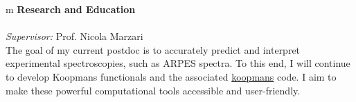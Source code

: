 \documentclass[10pt,a4paper,final]{article}
\begin{document}
\vspace{-10pt}
\begin{tabularx}{\textwidth}{
   m{\dimexpr{}\tabcolsep}}
   \large\textbf{\textcolor{seaborn_bg_grey_half}{Research and Education}} \\
   \hbox{%
   } \\
   \textit{Supervisor:} Prof. Nicola Marzari
   \\
   The goal of my current postdoc is to accurately predict and interpret experimental spectroscopies, such as ARPES spectra. To this end, I will continue to
   develop Koopmans functionals and the associated \href{https://koopmans-functionals.org/}{koopmans} code. I aim to make these powerful computational tools accessible and user-friendly.
   \\
   \hbox{%
   } \\

\end{tabularx}
\end{document}

